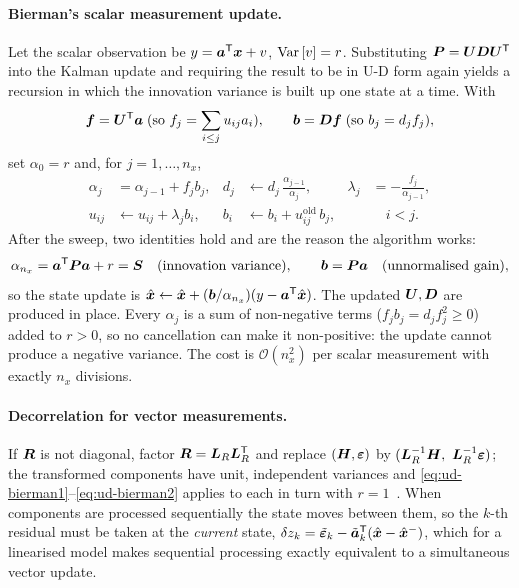 \paragraph{Bierman's scalar measurement update.} Let the scalar observation be
$y = \bm a^{\mathsf{T}}\bm{x} + v$, $\operatorname{Var}\left[v\right] = r$. Substituting $\bm{P} = \bm{U}\bm{D}\bm{U}^{\mathsf{T}}$ into the Kalman update
and requiring the result to be in U-D form again yields a recursion in which the innovation
variance is built up one state at a time. With
\begin{equation}
\bm f = \bm{U}^{\mathsf{T}}\bm a \;(\text{so } f_j = \sum_{i\le j} u_{ij}a_i), \qquad
\bm b = \bm{D}\bm f \;(\text{so } b_j = d_j f_j),
\label{eq:ud-fb}
\end{equation}
set $\alpha_0 = r$ and, for $j = 1,\dots,n_x$,
\begin{align}
\alpha_j &= \alpha_{j-1} + f_j b_j, &
d_j &\leftarrow d_j\,\frac{\alpha_{j-1}}{\alpha_j}, &
\lambda_j &= -\frac{f_j}{\alpha_{j-1}},
\label{eq:ud-bierman1}\\
u_{ij} &\leftarrow u_{ij} + \lambda_j b_i, &
b_i &\leftarrow b_i + u_{ij}^{\text{old}}\,b_j, & &\quad i<j .
\label{eq:ud-bierman2}
\end{align}
After the sweep, two identities hold and are the reason the algorithm works:
\begin{equation}
\alpha_{n_x} = \bm a^{\mathsf{T}}\bm{P}\bm a + r = \bm{S} \quad\text{(innovation variance)},\qquad
\bm b = \bm{P}\bm a \quad\text{(unnormalised gain)},
\label{eq:ud-identities}
\end{equation}
so the state update is $\hat{\bm{x}} \leftarrow \hat{\bm{x}} + (\bm b/\alpha_{n_x})(y - \bm a^{\mathsf{T}}\hat{\bm{x}})$. The
updated $\bm{U},\bm{D}$ are produced in place. Every $\alpha_j$ is a sum of non-negative terms
($f_jb_j = d_jf_j^2 \ge 0$) added to $r>0$, so no cancellation can make it non-positive: the
update cannot produce a negative variance. The cost is $\mathcal{O}(n_x^2)$ per scalar
measurement with exactly $n_x$ divisions.

\paragraph{Decorrelation for vector measurements.} If $\bm{R}$ is not diagonal, factor
$\bm{R} = \bm{L}_R\bm{L}_R^{\mathsf{T}}$ and replace $(\bm{H},\bm{\bm{\varepsilon}})$ by
$(\bm{L}_R^{-1}\bm{H},\ \bm{L}_R^{-1}\bm{\bm{\varepsilon}})$; the transformed components have unit, independent
variances and \eqref{eq:ud-bierman1}--\eqref{eq:ud-bierman2} applies to each in turn with
$r=1$~\cite[\S V.4]{bierman1977}. When components are processed sequentially the state moves
between them, so the $k$-th residual must be taken at the \emph{current} state,
$\delta z_k = \tilde{\bm{\varepsilon}}_k - \tilde{\bm a}_k^{\mathsf{T}}(\hat{\bm{x}} - \hat{\bm{x}}^{-})$, which for a linearised
model makes sequential processing exactly equivalent to a simultaneous vector update.

